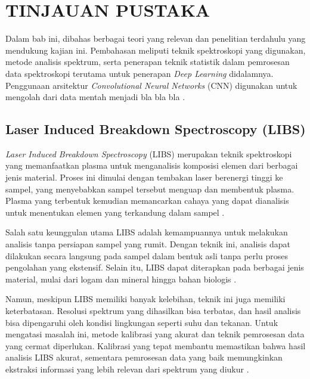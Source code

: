 \chapter{TINJAUAN PUSTAKA}
\par Dalam bab ini, dibahas berbagai teori yang relevan dan penelitian terdahulu yang mendukung kajian ini. Pembahasan meliputi teknik spektroskopi yang digunakan, metode analisis spektrum, serta penerapan teknik statistik dalam pemrosesan data spektroskopi terutama untuk penerapan \textit{Deep Learning} didalamnya. Penggunaan arsitektur \textit{Convolutional Neural Networks} (CNN) digunakan untuk mengolah dari data mentah menjadi bla bla bla \cite{Zhao2022}.

\section{Laser Induced Breakdown Spectroscopy (LIBS)}
\par \textit{Laser Induced Breakdown Spectroscopy} (LIBS) merupakan teknik spektroskopi yang memanfaatkan plasma untuk menganalisis komposisi elemen dari berbagai jenis material. Proses ini dimulai dengan tembakan laser berenergi tinggi ke sampel, yang menyebabkan sampel tersebut menguap dan membentuk plasma. Plasma yang terbentuk kemudian memancarkan cahaya yang dapat dianalisis untuk menentukan elemen yang terkandung dalam sampel \citep{morris2020}.

\par Salah satu keunggulan utama LIBS adalah kemampuannya untuk melakukan analisis tanpa persiapan sampel yang rumit. Dengan teknik ini, analisis dapat dilakukan secara langsung pada sampel dalam bentuk asli tanpa perlu proses pengolahan yang ekstensif. Selain itu, LIBS dapat diterapkan pada berbagai jenis material, mulai dari logam dan mineral hingga bahan biologis \citep{harrison2021}.

\par Namun, meskipun LIBS memiliki banyak kelebihan, teknik ini juga memiliki keterbatasan. Resolusi spektrum yang dihasilkan bisa terbatas, dan hasil analisis bisa dipengaruhi oleh kondisi lingkungan seperti suhu dan tekanan. Untuk mengatasi masalah ini, metode kalibrasi yang akurat dan teknik pemrosesan data yang cermat diperlukan. Kalibrasi yang tepat membantu memastikan bahwa hasil analisis LIBS akurat, sementara pemrosesan data yang baik memungkinkan ekstraksi informasi yang lebih relevan dari spektrum yang diukur \citep{corsi2021}.

